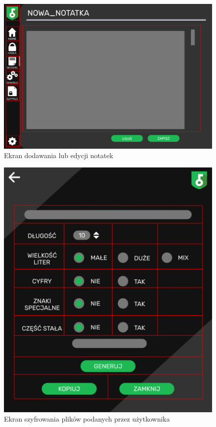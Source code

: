 \documentclass[a4paper]{article}
\begin{document}
\begin{figure}[H]
    \centering
    \includegraphics[width=1\textwidth]{img/ekran_nowej_not.png}
    \caption{Ekran dodawania lub edycji notatek}
    \label{fig:notatkNowe}
\end{figure}

\begin{figure}[H]
    \centering
    \includegraphics[width=1\textwidth]{img/ekran_generacji.png}
    \caption{Ekran szyfrowania plików podanych przez użytkownika}
    \label{fig:szyfrowanie}
\end{figure}
\end{document}
